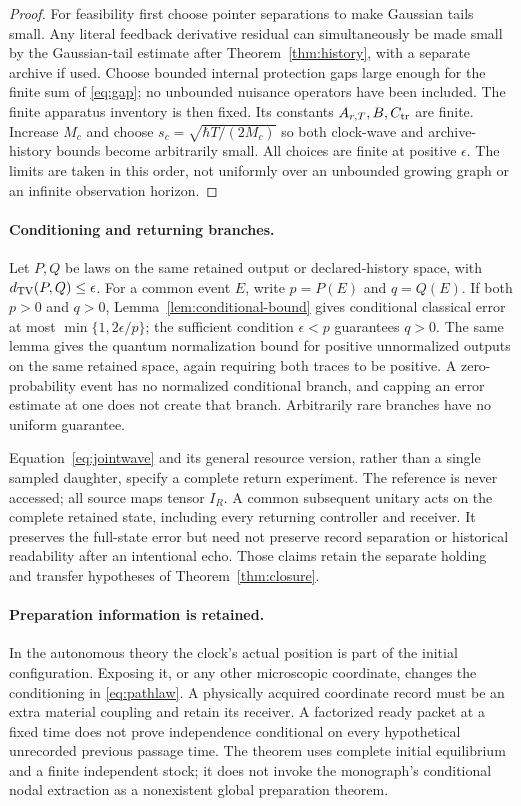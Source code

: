 \documentclass[11pt]{article}
\theoremstyle{definition}\newtheorem{assumption}[theorem]{Constitutive assumption}
\theoremstyle{remark}\newtheorem{remark}[theorem]{Remark}
\begin{document}
\begin{proof}
For feasibility first choose pointer separations to make Gaussian tails small. Any literal feedback derivative residual can simultaneously be made small by the Gaussian-tail estimate after Theorem~\ref{thm:history}, with a separate archive if used. Choose bounded internal protection gaps large enough for the finite sum of \eqref{eq:gap}; no unbounded nuisance operators have been included. The finite apparatus inventory is then fixed. Its constants $A_{r,T},B,C_{\rm tr}$ are finite. Increase $M_c$ and choose $s_c=\sqrt{\hbar T/(2M_c)}$ so both clock-wave and archive-history bounds become arbitrarily small. All choices are finite at positive $\epsilon$. The limits are taken in this order, not uniformly over an unbounded growing graph or an infinite observation horizon.
\end{proof}

\paragraph{Conditioning and returning branches.}
Let $P,Q$ be laws on the same retained output or declared-history space, with $d_{\rm TV}(P,Q)\le\epsilon$. For a common event $E$, write $p=P(E)$ and $q=Q(E)$. If both $p>0$ and $q>0$, Lemma~\ref{lem:conditional-bound} gives conditional classical error at most $\min\{1,2\epsilon/p\}$; the sufficient condition $\epsilon<p$ guarantees $q>0$. The same lemma gives the quantum normalization bound for positive unnormalized outputs on the same retained space, again requiring both traces to be positive. A zero-probability event has no normalized conditional branch, and capping an error estimate at one does not create that branch. Arbitrarily rare branches have no uniform guarantee.

Equation~\eqref{eq:jointwave} and its general resource version, rather than a single sampled daughter, specify a complete return experiment. The reference is never accessed; all source maps tensor $I_R$. A common subsequent unitary acts on the complete retained state, including every returning controller and receiver. It preserves the full-state error but need not preserve record separation or historical readability after an intentional echo. Those claims retain the separate holding and transfer hypotheses of Theorem~\ref{thm:closure}.

\paragraph{Preparation information is retained.}
In the autonomous theory the clock's actual position is part of the initial configuration. Exposing it, or any other microscopic coordinate, changes the conditioning in \eqref{eq:pathlaw}. A physically acquired coordinate record must be an extra material coupling and retain its receiver. A factorized ready packet at a fixed time does not prove independence conditional on every hypothetical unrecorded previous passage time. The theorem uses complete initial equilibrium and a finite independent stock; it does not invoke the monograph's conditional nodal extraction as a nonexistent global preparation theorem.
\end{document}
